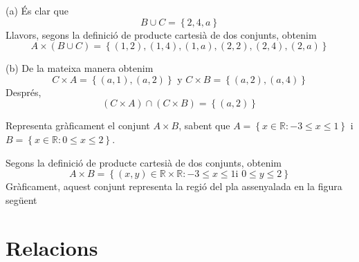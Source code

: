 \begin{solucio}
(a) \'{E}s clar que%
\begin{equation*}
B\cup C=\left\{ 2,4,a\right\}
\end{equation*}%
Llavors, segons la definici\'{o} de producte cartesi\`{a} de dos conjunts,
obtenim%
\begin{equation*}
A\times (B\cup C)=\left\{ (1,2),(1,4),(1,a),(2,2),(2,4),(2,a)\right\}
\end{equation*}

(b) De la mateixa manera obtenim%
\begin{equation*}
C\times A=\left\{ (a,1),(a,2)\right\} \text{ \ \ \ y \ \ \ }C\times
B=\left\{ (a,2),(a,4)\right\}
\end{equation*}%
Despr\'{e}s,%
\begin{equation*}
(C\times A)\cap (C\times B)=\left\{ (a,2)\right\}
\end{equation*}
\end{solucio}

\begin{exercici}
Representa gr\`{a}ficament el conjunt $A\times B$, sabent que $A=\left\{
x\in \mathbb{R}:-3\leq x\leq 1\right\} $ i $B=\left\{ x\in \mathbb{R}:0\leq
x\leq 2\right\} $.
\end{exercici}

\begin{solucio}
Segons la definici\'{o} de producte cartesi\`{a} de dos conjunts, obtenim%
\begin{equation*}
A\times B=\left\{ (x,y)\in \mathbb{R}\times \mathbb{R}:-3\leq x\leq 1\text{
\ i \ }0\leq y\leq 2\right\}
\end{equation*}%
Gr\`{a}ficament, aquest conjunt representa la regi\'{o} del pla assenyalada
en la figura seg\"{u}ent
\end{solucio}

\section{Relacions}

